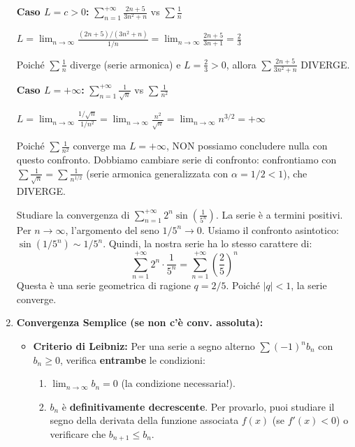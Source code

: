 \begin{enumerate}
    \begin{esempio}
    \textbf{Caso $L = c > 0$:} $\sum_{n=1}^{+\infty} \frac{2n + 5}{3n^2 + n}$ vs $\sum \frac{1}{n}$
    
    $L = \lim_{n \to \infty} \frac{(2n + 5)/(3n^2 + n)}{1/n} = \lim_{n \to \infty} \frac{2n + 5}{3n + 1} = \frac{2}{3}$
    
    Poiché $\sum \frac{1}{n}$ diverge (serie armonica) e $L = \frac{2}{3} > 0$, allora $\sum \frac{2n + 5}{3n^2 + n}$ DIVERGE.
    \end{esempio}

    \begin{esempio}
    \textbf{Caso $L = +\infty$:} $\sum_{n=1}^{+\infty} \frac{1}{\sqrt{n}}$ vs $\sum \frac{1}{n^2}$
    
    $L = \lim_{n \to \infty} \frac{1/\sqrt{n}}{1/n^2} = \lim_{n \to \infty} \frac{n^2}{\sqrt{n}} = \lim_{n \to \infty} n^{3/2} = +\infty$
    
    Poiché $\sum \frac{1}{n^2}$ converge ma $L = +\infty$, NON possiamo concludere nulla con questo confronto. Dobbiamo cambiare serie di confronto: confrontiamo con $\sum \frac{1}{\sqrt{n}} = \sum \frac{1}{n^{1/2}}$ (serie armonica generalizzata con $\alpha = 1/2 < 1$), che DIVERGE.
    \end{esempio}

    \begin{esempio}
    Studiare la convergenza di $\sum_{n=1}^{+\infty} 2^n \sin\left(\frac{1}{5^n}\right)$.
    La serie è a termini positivi. Per $n \to \infty$, l'argomento del seno $1/5^n \to 0$. Usiamo il confronto asintotico: $\sin(1/5^n) \sim 1/5^n$. 
    Quindi, la nostra serie ha lo stesso carattere di:
    \[ \sum_{n=1}^{+\infty} 2^n \cdot \frac{1}{5^n} = \sum_{n=1}^{+\infty} \left(\frac{2}{5}\right)^n \]
    Questa è una serie geometrica di ragione $q=2/5$.  Poiché $|q|<1$, la serie converge. 
    \end{esempio}

    \item \textbf{Convergenza Semplice (se non c'è conv. assoluta):}
    \begin{itemize}
        \item \textbf{Criterio di Leibniz:} Per una serie a segno alterno $\sum (-1)^n b_n$ con $b_n \ge 0$, verifica \textbf{entrambe} le condizioni: 
        \begin{enumerate}
            \item $\lim_{n \to \infty} b_n = 0$ (la condizione necessaria!). 
            \item $b_n$ è \textbf{definitivamente decrescente}. Per provarlo, puoi studiare il segno della derivata della funzione associata $f(x)$ (se $f'(x) < 0$) o verificare che $b_{n+1} \le b_n$. 
        \end{enumerate}


\end{itemize}
\end{enumerate}
